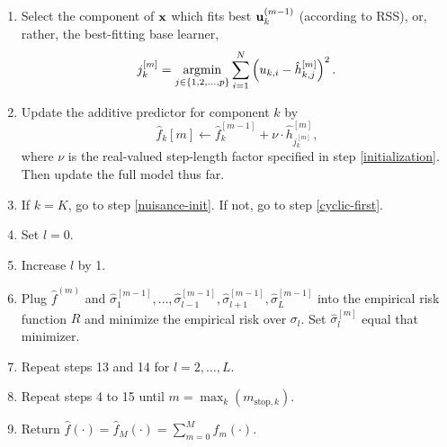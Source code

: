 \begin{algorithm}
\begin{enumerate}
    \item Select the component of $\mathbf{x}$ which fits best $\mathbf{u}^{(m-1)}_k$ (according to RSS), or, rather, the best-fitting base learner,
        \begin{equation}
            j_k^{[m]}=\operatorname*{argmin}_{j\in\{1,2,\ldots,p\}}\sum_{i=1}^N \left(u_{k,i}-\hat{h}_{k,j}^{[m]}\right)^2.
        \end{equation}
    \item\label{cyclic-last} Update the additive predictor for component $k$ by
        \begin{equation}
            \hat{f}_k{[m]}\gets\hat{f}_k^{[m-1]}+\nu\cdot\hat{h}_{j_k^{[m]}}^{[m]},
        \end{equation}
        where $\nu$ is the real-valued step-length factor specified in step \ref{initialization}. Then update the full model thus far.
    \item\label{repeat-step} If $k=K$, go to step \ref{nuisance-init}. If not, go to step \ref{cyclic-first}.
    \item\label{nuisance-init} Set $l=0$.
    \item\label{nuisance-first} Increase $l$ by 1.
    \item Plug $\hat{f}^{(m)}$ and $\hat{\sigma}_1^{[m-1]},\ldots,\hat{\sigma}_{l-1}^{[m-1]},\hat{\sigma}_{l+1}^{[m-1]},\hat{\sigma}_{L}^{[m-1]}$ into the empirical risk function $R$ and minimize the empirical risk over $\sigma_l$. Set $\hat{\sigma}_l^{[m]}$ equal that minimizer.
    \item Repeat steps 13 and 14 for $l=2,\ldots,L$.
    \item Repeat steps 4 to 15 until $m=\max_k(m_{\text{stop},k})$.
    \item Return $\hat{f}(\cdot)=\hat{f}_M(\cdot)=\sum_{m=0}^Mf_m(\cdot)$.
\end{enumerate}
\end{algorithm}

